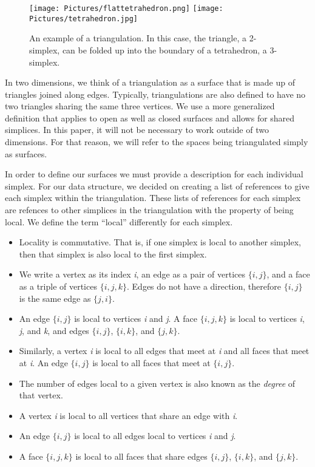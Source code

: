 \documentclass[12pt]{article}
\begin{document}
\begin{figure}
\texttt{[image: Pictures/flattetrahedron.png]}
\texttt{[image: Pictures/tetrahedron.jpg]}
\caption{An example of a triangulation. In this case, the triangle, a 2-simplex, can be folded up into the boundary of a tetrahedron, a 3-simplex.}
\end{figure}

 In two dimensions, we think of a triangulation as a surface that is made up of triangles joined along edges. Typically, triangulations are also defined to have no two triangles sharing the same three vertices. We use a more generalized definition that applies to open as well as closed surfaces and allows for shared simplices. In this paper, it will not be necessary to work outside of two dimensions. For that reason, we will refer to the spaces being triangulated simply as surfaces.

 In order to define our surfaces we must provide a description for each individual simplex. For our data structure, we decided on creating a list of references to give each simplex within the triangulation. These lists of references for each simplex are refences to other simplices in the triangulation with the property of being local. We define the term ``local'' differently for each simplex.

\begin{itemize}
\item Locality is commutative. That is, if one simplex is local to another simplex, then that simplex is also local to the first simplex.
\item We write a vertex as its index \textit{i}, an edge as a pair of vertices $\{i, j\}$, and a face as a triple of vertices $\{i, j, k\}$. Edges do not have a direction, therefore $\{i, j\}$ is the same edge as $\{j, i\}$. 
\item An edge $\{i, j\}$ is local to vertices \textit{i} and \textit{j}. A face $\{i, j, k\}$ is local to vertices \textit{i}, \textit{j}, and \textit{k}, and edges $\{i, j\}$, $\{i, k\}$, and $\{j, k\}$.
\item Similarly, a vertex \textit{i} is local to all edges that meet at \textit{i} and all faces that meet at \textit{i}. An edge $\{i, j\}$ is local to all faces that meet at $\{i, j\}$.
\item The number of edges local to a given vertex is also known as the \textit{degree} of that vertex.
\item A vertex \textit{i} is local to all vertices that share an edge with \textit{i}.
\item An edge $\{i, j\}$ is local to all edges local to vertices \textit{i} and \textit{j}.
\item A face $\{i, j, k\}$ is local to all faces that share edges $\{i, j\}$, $\{i, k\}$, and $\{j, k\}$.
\end{itemize}
\end{document}
